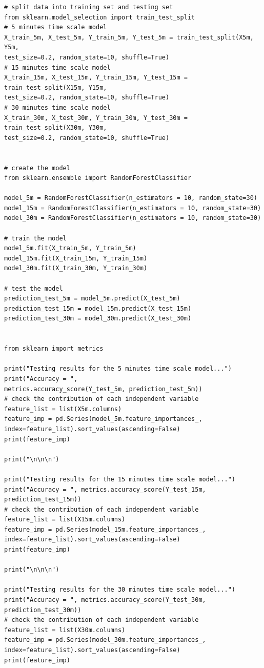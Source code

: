 \documentclass{article}
\begin{document}
\begin{appendices}
\begin{verbatim}
# split data into training set and testing set
from sklearn.model_selection import train_test_split
# 5 minutes time scale model
X_train_5m, X_test_5m, Y_train_5m, Y_test_5m = train_test_split(X5m, Y5m,
test_size=0.2, random_state=10, shuffle=True)
# 15 minutes time scale model
X_train_15m, X_test_15m, Y_train_15m, Y_test_15m = train_test_split(X15m, Y15m,
test_size=0.2, random_state=10, shuffle=True)
# 30 minutes time scale model
X_train_30m, X_test_30m, Y_train_30m, Y_test_30m = train_test_split(X30m, Y30m,
test_size=0.2, random_state=10, shuffle=True)


# create the model 
from sklearn.ensemble import RandomForestClassifier

model_5m = RandomForestClassifier(n_estimators = 10, random_state=30)
model_15m = RandomForestClassifier(n_estimators = 10, random_state=30)
model_30m = RandomForestClassifier(n_estimators = 10, random_state=30)

# train the model
model_5m.fit(X_train_5m, Y_train_5m)
model_15m.fit(X_train_15m, Y_train_15m)
model_30m.fit(X_train_30m, Y_train_30m)

# test the model
prediction_test_5m = model_5m.predict(X_test_5m)
prediction_test_15m = model_15m.predict(X_test_15m)
prediction_test_30m = model_30m.predict(X_test_30m)


from sklearn import metrics

print("Testing results for the 5 minutes time scale model...")
print("Accuracy = ", 
metrics.accuracy_score(Y_test_5m, prediction_test_5m)) 
# check the contribution of each independent variable
feature_list = list(X5m.columns)
feature_imp = pd.Series(model_5m.feature_importances_, 
index=feature_list).sort_values(ascending=False)
print(feature_imp)

print("\n\n\n")

print("Testing results for the 15 minutes time scale model...")
print("Accuracy = ", metrics.accuracy_score(Y_test_15m, 
prediction_test_15m)) 
# check the contribution of each independent variable
feature_list = list(X15m.columns)
feature_imp = pd.Series(model_15m.feature_importances_, 
index=feature_list).sort_values(ascending=False)
print(feature_imp)

print("\n\n\n")

print("Testing results for the 30 minutes time scale model...")
print("Accuracy = ", metrics.accuracy_score(Y_test_30m, 
prediction_test_30m)) 
# check the contribution of each independent variable
feature_list = list(X30m.columns)
feature_imp = pd.Series(model_30m.feature_importances_, 
index=feature_list).sort_values(ascending=False)
print(feature_imp)


\end{verbatim}
\end{appendices}
\end{document}
